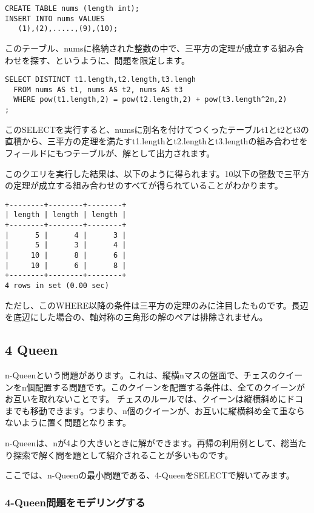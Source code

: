 \begin{verbatim}
CREATE TABLE nums (length int);
INSERT INTO nums VALUES
   (1),(2),.....,(9),(10);
\end{verbatim}

このテーブル、numsに格納された整数の中で、三平方の定理が成立する組み合わせを探す、というように、問題を限定します。

\begin{verbatim}
SELECT DISTINCT t1.length,t2.length,t3.lengh 
  FROM nums AS t1, nums AS t2, nums AS t3
  WHERE pow(t1.length,2) = pow(t2.length,2) + pow(t3.length^2m,2) 
;
\end{verbatim}

このSELECTを実行すると、numsに別名を付けてつくったテーブルt1とt2とt3の直積から、三平方の定理を満たすt1.lengthとt2.lengthとt3.lengthの組み合わせをフィールドにもつテーブルが、解として出力されます。

このクエリを実行した結果は、以下のように得られます。10以下の整数で三平方の定理が成立する組み合わせのすべてが得られていることがわかります。

\begin{verbatim}
+--------+--------+--------+
| length | length | length |
+--------+--------+--------+
|      5 |      4 |      3 |
|      5 |      3 |      4 |
|     10 |      8 |      6 |
|     10 |      6 |      8 |
+--------+--------+--------+
4 rows in set (0.00 sec)
\end{verbatim}

ただし、このWHERE以降の条件は三平方の定理のみに注目したものです。長辺を底辺にした場合の、軸対称の三角形の解のペアは排除されません。


\subsection{4 Queen}

n-Queenという問題があります。これは、縦横nマスの盤面で、チェスのクイーンをn個配置する問題です。このクイーンを配置する条件は、全てのクイーンがお互いを取れないことです。
チェスのルールでは、クイーンは縦横斜めにドコまでも移動できます。つまり、n個のクイーンが、お互いに縦横斜め全て重ならないように置く問題となります。

n-Queenは、nが4より大きいときに解ができます。再帰の利用例として、総当たり探索で解く問を題として紹介されることが多いものです。

ここでは、n-Queenの最小問題である、4-QueenをSELECTで解いてみます。

\subsubsection{4-Queen問題をモデリングする}

